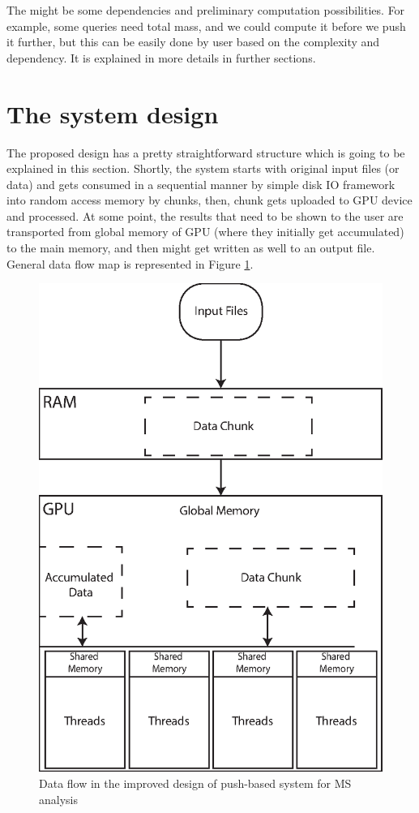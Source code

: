 \documentclass[10pt,journal,final,letterpaper,twocolumn]{IEEEtran}
\begin{document}
The might be some dependencies and preliminary computation possibilities. For example, some queries need total mass, and we could compute it before we push it further, but this can be easily done by user based on the complexity and dependency. It is explained in more details in further sections.


\vspace{3mm}
\section{The system design}\label{sc:system}
\vspace{3mm}

The proposed design has a pretty straightforward structure which is going to be explained in this section. Shortly, the system starts with original input files (or data) and gets consumed in a sequential manner by simple disk IO framework into random access memory by chunks, then, chunk gets uploaded to GPU device and processed. At some point, the results that need to be shown to the user are transported from global memory of GPU (where they initially get accumulated) to the main memory, and then might get written as well to an output file. General data flow map is represented in Figure  \ref{fg:data-flow}.

\begin{figure}
 \centerline{ \includegraphics[width=0.65\columnwidth]{images/memory-organization.eps} }
 \caption{Data flow in the improved design of push-based system for MS analysis}
 \label{fg:data-flow}
\end{figure}
\end{document}
